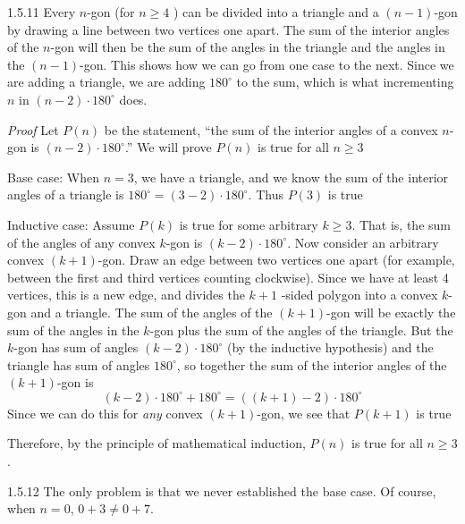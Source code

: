 \documentclass[11pt,]{book}
\makeatletter
\theoremstyle{ptxplainnotitle}
\theoremstyle{ptxplaintitle}
\renewcommand*{\proofname}{Proof}
\renewenvironment{proof}[1][\proofname]{\par
  \pushQED{\qed}%
  \normalfont \topsep6\p@\@plus6\p@\relax
  \trivlist
  \item\relax
    {\itshape
    #1\@addpunct{.}}\hspace\labelsep\ignorespaces
}{%
  \popQED\endtrivlist\@endpefalse
}
\theoremstyle{ptxdefinitionnotitle}
\theoremstyle{ptxdefinitiontitle}
\theoremstyle{ptxdefinitionnotitle}
\theoremstyle{ptxdefinitiontitle}
\theoremstyle{ptxdefinitionnotitle}
\theoremstyle{ptxdefinitiontitle}
\theoremstyle{ptxdefinitiontitlenonumber}
\theoremstyle{ptxdefinitiontitlenonumber}
\numberwithin{equation}{chapter}
\makeatother
\begin{document}
\begin{divisionexercise}{1.5.11}
\textbf{}\hypertarget{p-616}{}%
Every \(n\)-gon (for \(n \ge 4\) ) can be divided into a triangle and a \((n-1)\)-gon by drawing a line between two vertices one apart.  The sum of the interior angles of the \(n\)-gon will then be the sum of the angles in the triangle and the angles in the \((n-1)\)-gon.  This shows how we can go from one case to the next.  Since we are adding a triangle, we are adding \(180^\circ\) to the sum, which is what incrementing \(n\) in \((n-2)\cdot 180^\circ\) does.%
\begin{proof}\hypertarget{proof-10}{}
\hypertarget{p-617}{}%
Let \(P(n)\) be the statement, ``the sum of the interior angles of a convex \(n\)-gon is \((n-2)\cdot 180^\circ\).''  We will prove \(P(n)\) is true for all \(n \ge 3\)%
\par
\hypertarget{p-618}{}%
Base case: When \(n=3\), we have a triangle, and we know the sum of the interior angles of a triangle is \(180^\circ = (3-2)\cdot 180^\circ\).  Thus \(P(3)\) is true%
\par
\hypertarget{p-619}{}%
Inductive case: Assume \(P(k)\) is true for some arbitrary \(k \ge 3\).  That is, the sum of the angles of any convex \(k\)-gon is \((k-2)\cdot 180^\circ\).  Now consider an arbitrary convex \((k+1)\)-gon.  Draw an edge between two vertices one apart (for example, between the first and third vertices counting clockwise).  Since we have at least 4 vertices, this is a new edge, and divides the \(k+1\) -sided polygon into a convex \(k\)-gon and a triangle.  The sum of the angles of the \((k+1)\)-gon will be exactly the sum of the angles in the \(k\)-gon plus the sum of the angles of the triangle.  But the \(k\)-gon has sum of angles \((k-2)\cdot 180^\circ\) (by the inductive hypothesis) and the triangle has sum of angles \(180^\circ\), so together the sum of the interior angles of the \((k+1)\)-gon is%
\begin{equation*}
(k-2)\cdot 180^\circ + 180^\circ = ((k+1)-2)\cdot 180^\circ
\end{equation*}
Since we can do this for \emph{any} convex \((k+1)\)-gon, we see that \(P(k+1)\) is true%
\par
\hypertarget{p-620}{}%
Therefore, by the principle of mathematical induction, \(P(n)\) is true for all \(n\ge 3\).%
\end{proof}
\end{divisionexercise}%
\begin{divisionexercise}{1.5.12}
\textbf{}\hypertarget{p-623}{}%
The only problem is that we never established the base case. Of course, when \(n = 0\), \(0+3 \ne 0+7\).%
\end{divisionexercise}%
\end{document}
